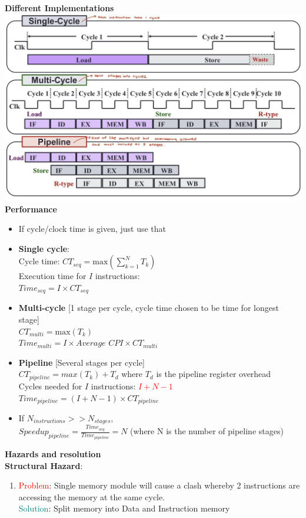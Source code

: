 \documentclass[a4paper]{article} \usepackage[backend=biber, style=numeric, sorting=none]{biblatex}
\begin{document}
\begin{multicols*}{4}
\columnbreak
\textbf{Different Implementations}\\
\includegraphics[width=\columnwidth]{implementations}
\textbf{{Performance}}
\begin{itemize}
\item If cycle/clock time is given, just use that
\item \textbf{Single cycle}:
    \\ Cycle time: $CT_{seq} = \text{max}(\sum^N_{k=1}T_k)$
    \\ Execution time for $I$ instructions:\\ $Time_{seq}  = I \times CT_{seq}$
\item \textbf{Multi-cycle} [1 stage per cycle, cycle time chosen to be time for longest stage]
    \\ $CT_{multi} = \text{max}(T_k)$
    \\ $Time_{multi} = I \times \textit{Average CPI} \times CT_{multi}$
\item \textbf{Pipeline} [Several stages per cycle]
    \\ $CT_{pipeline} = max(T_k) + T_d$ where $T_d$ is the pipeline register overhead
    \\ Cycles needed for $I$ instructions: \textcolor{red}{$I + N - 1$}
    \\ $Time_{pipeline} = (I + N - 1) \times CT_{pipeline}$
\item If $N_{instructions} >> N_{stages}$,
    \\ $Speedup_{pipeline} = \frac{Time_{seq}}{Time_{pipeline}} = N$ (where N is the number of pipeline stages)\\
\end{itemize}

\textbf{Hazards and resolution}\\
\textbf{Structural Hazard}:
    \begin{enumerate}[leftmargin=*]
        \item \textcolor{red}{Problem}: Single memory module will cause a clash whereby 2 instructions are accessing the memory at the same cycle.
        \\\textcolor{teal}{Solution}: Split memory into Data and Instruction memory


\end{enumerate}
\end{multicols*}
\end{document}
